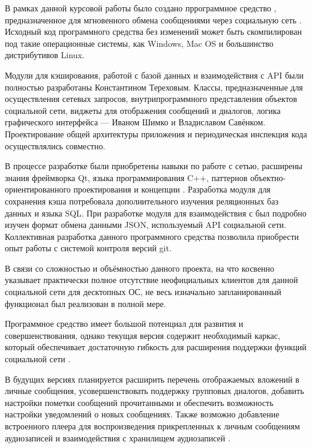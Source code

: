 
В рамках данной курсовой работы было создано пррограммное средство \vkapp{},
предназначенное для мгновенного обмена сообщениями через социальную сеть \vk{}.
Исходный код программного средства без изменений может быть скомпилирован
под такие операционные системы, как Windows, Mac OS и большинство дистрибутивов
Linux.

Модули для кэширования, работой с базой данных и взаимодействия с API \vk{} были
полностью разработаны Константином Тереховым. Классы, предназначенные для
осуществления сетевых запросов, внутрипрограммного представления объектов
социальной сети, виджеты для отображения сообщений и диалогов, логика
графического интерфейса --- Иваном Шимко и Владиславом Савёнком. Проектирование
общей архитектуры приложения и периодическая инспекция кода осуществлялись
совместно.

В процессе разработке были приобретены навыки по работе с сетью, расширены
знания фреймворка Qt, языка программирования C++, паттернов
объектно-ориентированного проектирования и концепции \mvc{}.
Разработка модуля для сохранения кэша потребовала дополнительного изучения
реляционных баз данных и языка SQL. При разработке модуля для взаимодействия с
\vk{} был подробно изучен формат обмена данными JSON, используемый API
социальной сети. Коллективная разработка данного программного средства позволила
приобрести опыт работы с системой контроля версий git.

В связи со сложностью и объёмностью данного проекта, на что косвенно указывает
практически полное отсутствие неофициальных клиентов для данной социальной сети
для десктопных ОС, не весь изначально запланированный
функционал был реализован в полной мере.

Программное средство имеет большой потенциал для развития и совершенствования,
однако текущая версия содержит необходимый каркас, который обеспечивает
достаточную гибкость для расширения поддержки функций социальной сети \vk{}.

В будущих версиях планируется расширить перечень отображаемых вложений в личные
сообщения, усовершенствовать поддержку групповых диалогов, добавить настройки пометки
сообщений прочитанными и обеспечить возможность настройки уведомлений о
новых сообщениях. Также возможно добавление встроенного плеера для
воспроизведения прикрепленных к личным сообщениям аудиозаписей и взаимодействия
с хранилищем аудиозаписей \vk{}.
